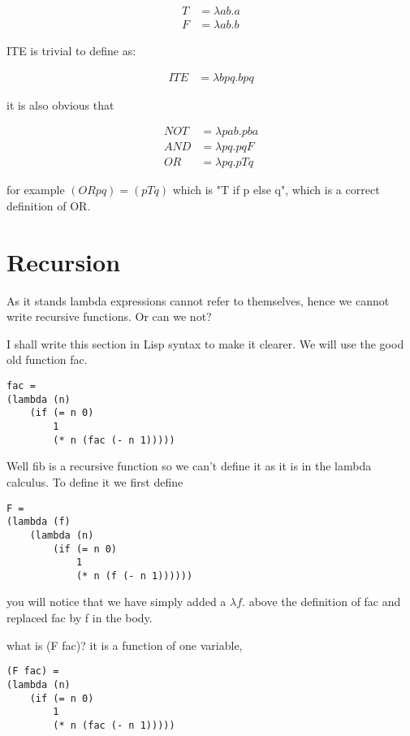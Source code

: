 \documentclass{article}
\begin{document}
\begin{align}
  T &= \lambda ab.a \\
  F &= \lambda ab.b
\end{align}

ITE is trivial to define as:

\begin{align}
ITE &= \lambda bpq.bpq
\end{align}

it is also obvious that

\begin{align}
NOT   &= \lambda pab. pba\\
AND   &= \lambda pq. pqF \\
OR    &= \lambda pq. pTq
\end{align}

for example $(OR p q) = (p T q)$ which is "T if p else q", which is a correct definition of OR.

\section{Recursion}

As it stands lambda expressions cannot refer to themselves, hence we cannot write recursive functions. Or can we not?

I shall write this section in Lisp syntax to make it clearer. We will use the good old function fac.

\begin{verbatim}
fac = 
(lambda (n)
    (if (= n 0)
        1
        (* n (fac (- n 1)))))
\end{verbatim}

Well fib is a recursive function so we can't define it as it is in the lambda calculus. To define it we first define 

\begin{verbatim}
F = 
(lambda (f)
    (lambda (n)
        (if (= n 0)
            1
            (* n (f (- n 1))))))
\end{verbatim}

you will notice that we have simply added a $\lambda f.$ above the definition of fac and replaced fac by f in the body.

what is (F fac)? it is a function of one variable,

\begin{verbatim}
(F fac) = 
(lambda (n)
    (if (= n 0)
        1
        (* n (fac (- n 1)))))
\end{verbatim}
\end{document}

